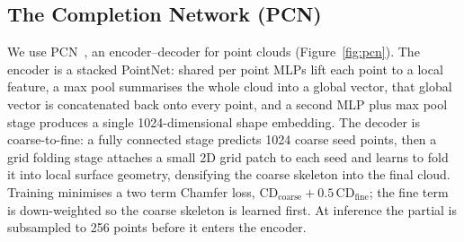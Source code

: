 \documentclass[a4paper,12pt]{report}
\begin{document}
\subsection{The Completion Network (PCN)}
\label{sec:completion-pcn}

We use PCN~\cite{yuan2019pcnpointcompletionnetwork}, an encoder--decoder for point clouds
(Figure~\ref{fig:pcn}). The encoder is a stacked PointNet: shared per point MLPs
lift each point to a local feature, a max pool summarises the whole cloud into a
global vector, that global vector is concatenated back onto every point, and a
second MLP plus max pool stage produces a single \num{1024}-dimensional shape
embedding. The decoder is coarse-to-fine: a fully connected stage predicts
\num{1024} coarse seed points, then a grid folding stage attaches a small
2D grid patch to each seed and learns to fold it into local surface geometry,
densifying the coarse skeleton into the final cloud. Training minimises a
two term Chamfer loss, $\mathrm{CD}_{\text{coarse}} + 0.5\,\mathrm{CD}_{\text{fine}}$;
the fine term is down-weighted so the coarse skeleton is learned first. At
inference the partial is subsampled to \num{256} points before it enters the
encoder.
\end{document}
